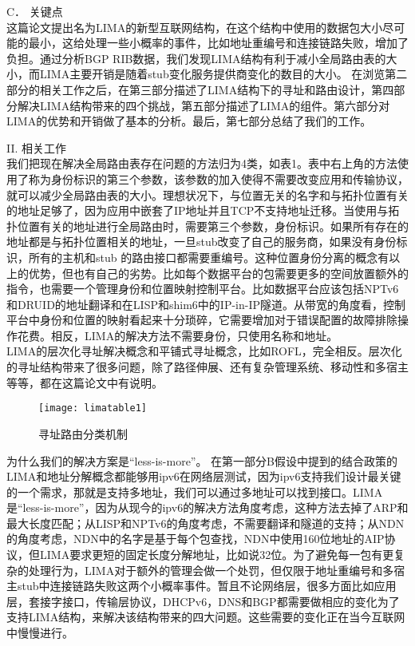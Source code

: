 C．	关键点\\
这篇论文提出名为LIMA的新型互联网结构，在这个结构中使用的数据包大小尽可能的最小，这给处理一些小概率的事件，比如地址重编号和连接链路失败，增加了负担。通过分析BGP RIB数据，我们发现LIMA结构有利于减小全局路由表的大小，而LIMA主要开销是随着stub变化服务提供商变化的数目的大小。
在浏览第二部分的相关工作之后，在第三部分描述了LIMA结构下的寻址和路由设计，第四部分解决LIMA结构带来的四个挑战，第五部分描述了LIMA的组件。第六部分对LIMA的优势和开销做了基本的分析。最后，第七部分总结了我们的工作。


II.	相关工作\\
我们把现在解决全局路由表存在问题的方法归为4类，如表1。表中右上角的方法使用了称为身份标识的第三个参数，该参数的加入使得不需要改变应用和传输协议，就可以减少全局路由表的大小。理想状况下，与位置无关的名字和与拓扑位置有关的地址足够了，因为应用中嵌套了IP地址并且TCP不支持地址迁移。当使用与拓扑位置有关的地址进行全局路由时，需要第三个参数，身份标识。如果所有存在的地址都是与拓扑位置相关的地址，一旦stub改变了自己的服务商，如果没有身份标识，所有的主机和stub 的路由接口都需要重编号。这种位置身份分离的概念有以上的优势，但也有自己的劣势。比如每个数据平台的包需要更多的空间放置额外的指令，也需要一个管理身份和位置映射控制平台。比如数据平台应该包括NPTv6和DRUID的地址翻译和在LISP和shim6中的IP-in-IP隧道。从带宽的角度看，控制平台中身份和位置的映射看起来十分琐碎，它需要增加对于错误配置的故障排除操作花费。相反，LIMA的解决方法不需要身份，只使用名称和地址。\\
LIMA的层次化寻址解决概念和平铺式寻址概念，比如ROFL，完全相反。层次化的寻址结构带来了很多问题，除了路径伸展、还有复杂管理系统、移动性和多宿主等等，都在这篇论文中有说明。

\begin{figure}
  \centering
  \texttt{[image: limatable1]}\\
  \caption{寻址路由分类机制}\label{fig:limatable1}
\end{figure}

为什么我们的解决方案是“less-is-more”。 在第一部分B假设中提到的结合政策的LIMA和地址分解概念都能够用ipv6在网络层测试，因为ipv6支持我们设计最关键的一个需求，那就是支持多地址，我们可以通过多地址可以找到接口。LIMA是“less-is-more”，因为从现今的ipv6的解决方法角度考虑，这种方法去掉了ARP和最大长度匹配；从LISP和NPTv6的角度考虑，不需要翻译和隧道的支持；从NDN的角度考虑，NDN中的名字是基于每个包查找，NDN中使用160位地址的AIP协议，但LIMA要求更短的固定长度分解地址，比如说32位。为了避免每一包有更复杂的处理行为，LIMA对于额外的管理会做一个处罚，但仅限于地址重编号和多宿主stub中连接链路失败这两个小概率事件。暂且不论网络层，很多方面比如应用层，套接字接口，传输层协议，DHCPv6，DNS和BGP都需要做相应的变化为了支持LIMA结构，来解决该结构带来的四大问题。这些需要的变化正在当今互联网中慢慢进行。\\

